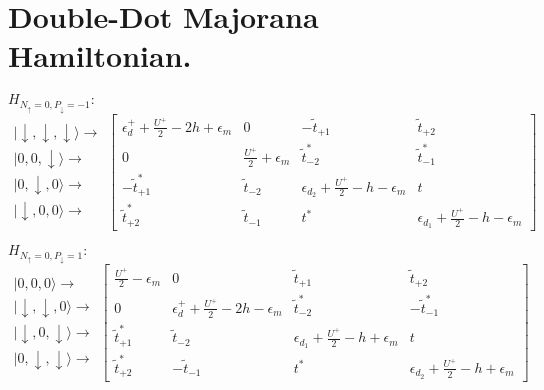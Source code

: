 \chapter{Double-Dot Majorana Hamiltonian.\label{chap:Double-Dot-Majorana-Hamiltonian.}}

$H_{N_{\uparrow}=0,P_{\downarrow}=-1}:$
\[
\begin{array}{c}
\vert\downarrow,\downarrow,\downarrow\rangle\rightarrow\\
\vert0,0,\downarrow\rangle\rightarrow\\
\vert0,\downarrow,0\rangle\rightarrow\\
\vert\downarrow,0,0\rangle\rightarrow
\end{array}\left[\begin{array}{cccc}
\epsilon_{d}^{+}+\frac{U^{+}}{2}-2h+\epsilon_{m} & 0 & -\tilde{t}_{+1} & \tilde{t}_{+2}\\
0 & \frac{U^{+}}{2}+\epsilon_{m} & \tilde{t}_{-2}^{*} & \tilde{t}_{-1}^{*}\\
-\tilde{t}_{+1}^{*} & \tilde{t}_{-2} & \epsilon_{d_{2}}+\frac{U^{+}}{2}-h-\epsilon_{m} & t\\
\tilde{t}_{+2}^{*} & \tilde{t}_{-1} & t^{*} & \epsilon_{d_{1}}+\frac{U^{+}}{2}-h-\epsilon_{m}
\end{array}\right]
\]


$H_{N_{\uparrow}=0,P_{\downarrow}=1}:$
\[
\begin{array}{c}
\vert0,0,0\rangle\rightarrow\\
\vert\downarrow,\downarrow,0\rangle\rightarrow\\
\vert\downarrow,0,\downarrow\rangle\rightarrow\\
\vert0,\downarrow,\downarrow\rangle\rightarrow
\end{array}\left[\begin{array}{cccc}
\frac{U^{+}}{2}-\epsilon_{m} & 0 & \tilde{t}_{+1} & \tilde{t}_{+2}\\
0 & \epsilon_{d}^{+}+\frac{U^{+}}{2}-2h-\epsilon_{m} & \tilde{t}_{-2}^{*} & -\tilde{t}_{-1}^{*}\\
\tilde{t}_{+1}^{*} & \tilde{t}_{-2} & \epsilon_{d_{1}}+\frac{U^{+}}{2}-h+\epsilon_{m} & t\\
\tilde{t}_{+2}^{*} & -\tilde{t}_{-1} & t^{*} & \epsilon_{d_{2}}+\frac{U^{+}}{2}-h+\epsilon_{m}
\end{array}\right]
\]


